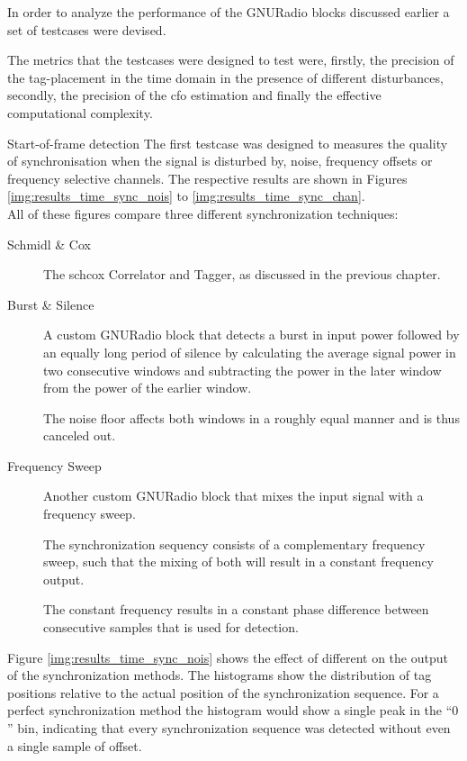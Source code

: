 In order to analyze the performance of the GNURadio blocks
discussed earlier a set of testcases were devised.

The metrics that the testcases were designed to test
were, firstly, the precision of the tag-placement in
the time domain in the presence of different disturbances,
secondly, the precision of the \gls{cfo} estimation
and finally the effective computational complexity.

\begin{subchapter}{Start-of-frame detection}
  The first testcase was designed to measures the quality
  of synchronisation when the signal is disturbed by,
  noise, frequency offsets or frequency selective channels.
  The respective results are shown in Figures \ref{img:results_time_sync_nois}
  to \ref{img:results_time_sync_chan}. \\

  All of these figures compare three different synchronization
  techniques:

  \begin{description}
    \item[Schmidl \& Cox]
      The \acrlong{schcox} Correlator and Tagger, as discussed in the
      previous chapter.

    \item[Burst \& Silence]
      A custom GNURadio block that detects a burst in input power
      followed by an equally long period of silence by calculating the
      average signal power in two consecutive windows and subtracting the
      power in the later window from the power of the earlier window.

      The noise floor affects both windows in a roughly equal manner
      and is thus canceled out.

    \item[Frequency Sweep]
      Another custom GNURadio block that mixes the input signal
      with a frequency sweep.

      The synchronization sequency consists of a complementary
      frequency sweep, such that the mixing of both will result
      in a constant frequency output.

      The constant frequency results in a constant phase difference
      between consecutive samples that is used for detection.
  \end{description}


  Figure \ref{img:results_time_sync_nois} shows the effect of
  different  on the output of the synchronization
  methods.
  The histograms show the distribution of tag positions
  relative to the actual position of the synchronization
  sequence.
  For a perfect synchronization method the histogram would
  show a single peak in the ``$0$'' bin, indicating that every
  synchronization sequence was detected without even a single
  sample of offset.


\end{subchapter}
